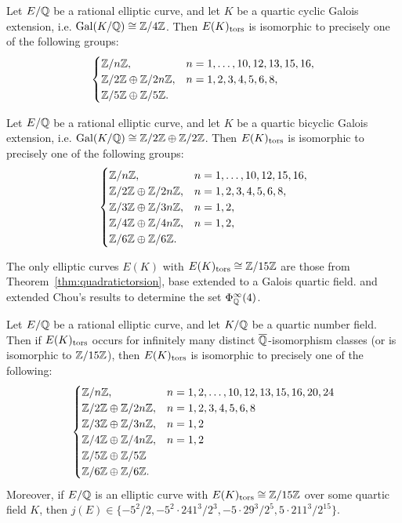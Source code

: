 \begin{thm}
Let $E/\mathbb{Q}$ be a rational elliptic curve, and let $K$ be a quartic cyclic Galois extension, i.e. $\operatorname{Gal}(K/\mathbb{Q}) \cong \mathbb{Z}/4\mathbb{Z}$. Then $E(K)_{\text{tors}}$ is isomorphic to precisely one of the following groups:
	\[
	\begin{cases}
	\mathbb{Z}/n\mathbb{Z}, & n= 1, \ldots, 10, 12, 13, 15, 16, \\
	\mathbb{Z}/2\mathbb{Z} \oplus \mathbb{Z}/2n\mathbb{Z}, & n= 1, 2, 3, 4, 5, 6, 8, \\
	\mathbb{Z}/5\mathbb{Z} \oplus \mathbb{Z}/5\mathbb{Z}.
	\end{cases}
	\]
\end{thm}


\begin{thm}
Let $E/\mathbb{Q}$ be a rational elliptic curve, and let $K$ be a quartic bicyclic Galois extension, i.e. $\operatorname{Gal}(K/\mathbb{Q}) \cong \mathbb{Z}/2\mathbb{Z} \oplus \mathbb{Z}/2\mathbb{Z}$. Then $E(K)_{\text{tors}}$ is isomorphic to precisely one of the following groups:
	\[
	\begin{cases}
	\mathbb{Z}/n\mathbb{Z}, & n= 1,\ldots, 10, 12, 15, 16, \\
	\mathbb{Z}/2\mathbb{Z} \oplus \mathbb{Z}/2n\mathbb{Z}, & n= 1, 2, 3, 4, 5, 6, 8, \\
	\mathbb{Z}/3\mathbb{Z} \oplus \mathbb{Z}/3n\mathbb{Z}, & n= 1,2, \\
	\mathbb{Z}/4\mathbb{Z} \oplus \mathbb{Z}/4n\mathbb{Z}, & n= 1,2, \\
	\mathbb{Z}/6\mathbb{Z} \oplus \mathbb{Z}/6\mathbb{Z}.
	\end{cases}
	\]
\end{thm}


The only elliptic curves $E(K)$ with $E(K)_{\text{tors}} \cong \mathbb{Z}/15\mathbb{Z}$ are those from Theorem~\ref{thm:quadratictorsion}, base extended to a Galois quartic field. \gonjim{} and \lozrob{} extended Chou's results to determine the set $\Phi_{\mathbb{Q}}^\infty(4)$.


\begin{thm} \label{thm:intquartic}
Let $E/\mathbb{Q}$ be a rational elliptic curve, and let $K/\mathbb{Q}$ be a quartic number field. Then if $E(K)_{\text{tors}}$ occurs for infinitely many distinct $\overline{\mathbb{Q}}$-isomorphism classes (or is isomorphic to $\mathbb{Z}/15\mathbb{Z}$), then $E(K)_{\text{tors}}$ is isomorphic to precisely one of the following:
	\[
	\begin{cases}
	\mathbb{Z}/n\mathbb{Z}, & n= 1, 2, \ldots, 10, 12, 13, 15, 16, 20, 24 \\
	\mathbb{Z}/2\mathbb{Z} \oplus \mathbb{Z}/2n\mathbb{Z}, & n= 1, 2, 3, 4, 5, 6, 8 \\
	\mathbb{Z}/3\mathbb{Z} \oplus \mathbb{Z}/3n\mathbb{Z}, & n= 1, 2 \\
	\mathbb{Z}/4\mathbb{Z} \oplus \mathbb{Z}/4n\mathbb{Z}, & n= 1, 2 \\
	\mathbb{Z}/5\mathbb{Z} \oplus \mathbb{Z}/5\mathbb{Z} \\
	\mathbb{Z}/6\mathbb{Z} \oplus \mathbb{Z}/6\mathbb{Z}.
	\end{cases}
	\]
Moreover, if $E/\mathbb{Q}$ is an elliptic curve with $E(K)_{\text{tors}} \cong \mathbb{Z}/15\mathbb{Z}$ over some quartic field $K$, then $j(E) \in \{ -5^2/2, -5^2 \cdot 241^3/2^3, -5 \cdot 29^3/2^5, 5 \cdot 211^3/2^{15} \}$. 
\end{thm}



